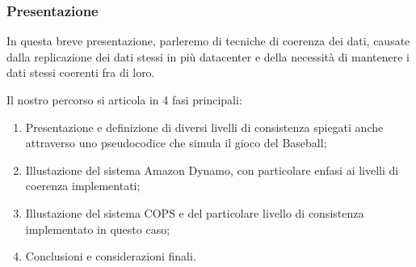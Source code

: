 \begin{frame}
\frametitle{Presentazione}
In questa breve presentazione, parleremo di tecniche di coerenza dei dati,
causate dalla replicazione dei dati stessi in più datacenter e 
della necessità di mantenere i dati stessi coerenti fra di loro.

Il nostro percorso si articola in 4 fasi principali:
\begin{enumerate}
	\item Presentazione e definizione di diversi livelli di consistenza
		  spiegati anche attraverso uno pseudocodice che simula il gioco del Baseball;
	\item Illustazione del sistema Amazon Dynamo, con particolare enfasi ai
		  livelli di coerenza implementati;
	\item Illustazione del sistema COPS e del particolare livello di consistenza
		  implementato in questo caso;
	\item Conclusioni e considerazioni finali.
\end{enumerate}
\end{frame}